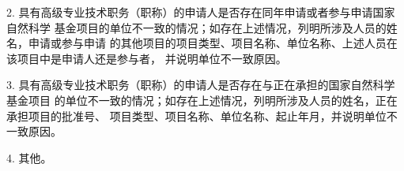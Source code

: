 \documentclass[12pt,UTF8,AutoFakeBold=3,a4paper]{article}
\newcommand{\sihao}{\fontsize{14pt}{\baselineskip}\selectfont}
\begin{document}
{\kaishu{}\sihao{} \color{NsfcBlue}
2. 具有高级专业技术职务（职称）的申请人是否存在同年申请或者参与申请国家自然科学
基金项目的单位不一致的情况；如存在上述情况，列明所涉及人员的姓名，申请或参与申请
的其他项目的项目类型、项目名称、单位名称、上述人员在该项目中是申请人还是参与者，
并说明单位不一致原因。
}

{\kaishu{}\sihao{} \color{NsfcBlue}
3. 具有高级专业技术职务（职称）的申请人是否存在与正在承担的国家自然科学基金项目
的单位不一致的情况；如存在上述情况，列明所涉及人员的姓名，正在承担项目的批准号、
项目类型、项目名称、单位名称、起止年月，并说明单位不一致原因。
}

{\kaishu{}\sihao{} \color{NsfcBlue}
4. 其他。
}

\end{document}
